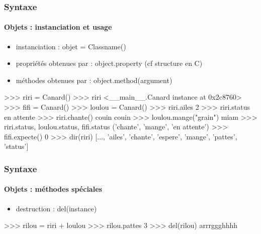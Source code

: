 \begin{frame}[fragile]
\frametitle{Syntaxe}
\framesubtitle{Objets : instanciation et usage}
\begin{itemize}
 \item instanciation : objet = Classname()
 \item propriétés obtenues par : object.property (cf structure en C)
 \item méthodes obtenues par : object.method(argument)
\end{itemize}
\begin{pythonConsole}
>>> riri = Canard()
>>> riri
<__main__.Canard instance at 0x2c8760>
>>> fifi = Canard()
>>> loulou = Canard()
>>> riri.ailes
2
>>> riri.status
en attente
>>> riri.chante()
couin couin
>>> loulou.mange("grain")
miam
>>> riri.status, loulou.status, fifi.status
('chante', 'mange', 'en attente')
>>> fifi.expecte()
0
>>> dir(riri)
[..., 'ailes', 'chante', 'espere', 'mange', 'pattes',
'status']
\end{pythonConsole}
\end{frame}
\begin{frame}[fragile]
\frametitle{Syntaxe}
\framesubtitle{Objets : méthodes spéciales}
\begin{itemize}
 \item destruction : del(instance)
\end{itemize}
\begin{pythonConsole}
>>> rilou = riri + loulou
>>> rilou.pattes
3
>>> del(rilou)
arrrggghhhh
\end{pythonConsole}
\end{frame}
